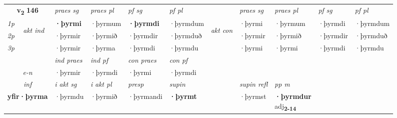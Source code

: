 \noindent
\begin{tabular}{lllllllllll} \toprule
\multicolumn{2}{c}{\textbf{v{\textsubscript{2}}} \Large{\textbf{146}}}  &  \textit{praes sg}  & \textit{praes pl}  &\textit{ pf sg} & \textit{pf pl} &  &  \textit{praes sg}  & \textit{praes pl}  & \textit{pf sg} & \textit{pf pl } \\*
	\cmidrule{3-6} \cmidrule{8-11}
 {\textit{1p}} & \multirow{3}{*}{\begin{turn}{90}\textit{akt ind}\end{turn}} & \textbf{·þyrmi} & ·þyrmum & \textbf{·þyrmdi} & ·þyrmdum & \multirow{3}{*}{\begin{turn}{90}\textit{akt con}\end{turn}} &·þyrmi & ·þyrmum & ·þyrmdi & ·þyrmdum\\*
 {\textit{2p}} &  &  ·þyrmir  & ·þyrmið & ·þyrmdir & ·þyrmduð & & ·þyrmir & ·þyrmið & ·þyrmdir & ·þyrmduð \\*
{\textit{3p}} &  & ·þyrmir & ·þyrma & ·þyrmdi & ·þyrmdu & & ·þyrmi & ·þyrmi& ·þyrmdi & ·þyrmdu \\*
\cmidrule{3-6} \cmidrule{8-11}

   & &  \textit{ind praes} & \textit{ind pf} & \textit{con praes} & \textit{con pf} \\*
\multicolumn{2}{c}{ \textit{e-n} } & ·þyrmir & ·þyrmdi & ·þyrmi & ·þyrmdi \\*

\cmidrule{3-9}
   \multicolumn{2}{c}{\textit{inf}}  & \textit{i akt sg} & \textit{i akt pl}   & \textit{presp} & \textit{supin} && \textit{supin refl} & \textit{pp m} \\*
  \multicolumn{2}{c}{\textbf{yfir\allowbreak ·þyrma}} & ·þyrmdu  & ·þyrmið   & ·þyrmandi &  \textbf{·þyrmt} && ·þyrmst & \specialcell{\textbf{·þyrmdur} \\ adj\textbf{\textsubscript{2-14}}} \\*
\end{tabular}

